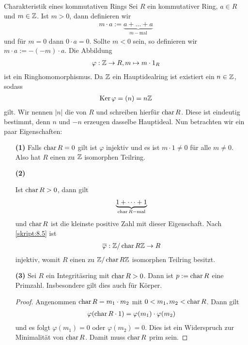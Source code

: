 \begin{genericdf}{Charakteristik eines kommutativen Rings}\label{skript:8.6}
	Sei $R$ ein kommutativer Ring, $a \in R$ und $m \in \mathbb{Z}$.
	Ist $m > 0 $, dann definieren wir 
	\begin{align*}
	m \cdot a := \underbrace{a + \dots + a}_{m-\text{mal}}
	\end{align*}
	und für $m=0$ dann $0 \cdot a = 0$.
	Sollte $m < 0 $ sein, so definieren wir $m \cdot a := -(-m) \cdot a$.
	Die Abbildung 
	\begin{align*}
	\varphi : \mathbb{Z} \to R, m \mapsto m \cdot 1_R
	\end{align*}
	ist ein Ringhomomorphismus.
	Da $\mathbb{Z}$ ein Hauptidealring ist existiert ein $n \in \mathbb{Z}$, sodass
	\begin{align*}
	\operatorname{Ker} \varphi = (n) = n \mathbb{Z}
	\end{align*}
	gilt.
	Wir nennen $|n|$ die  von $R$ und schreiben hierfür $\operatorname{char} R$.
	Diese ist eindeutig bestimmt, denn $n$ und $-n$ erzeugen dasselbe Hauptideal.
	Nun betrachten wir ein paar Eigenschaften:
	\begin{enumerate}
		\item[\textbf{(1)}]
		Falls $\operatorname{char} R = 0$ gilt ist $\varphi$ injektiv und es ist $m \cdot 1 \neq 0$ für alle $m \neq 0$.
		Also hat $R$ einen zu $\mathbb{Z}$ isomorphen Teilring.
		\item[\textbf{(2)}]
		
		Ist $\operatorname{char} R > 0$, dann gilt
		\begin{align*}
		\underbrace{1+ \dots + 1}_{\operatorname{char} R- \text{mal}}
		\end{align*}
		und $\operatorname{char} R$ ist die kleinste positive Zahl mit dieser Eigenschaft.
		Nach \ref{skript:8.5} ist 
		\begin{align*}
		\overline{\varphi} : \mathbb{Z} / \operatorname{char} R \mathbb{Z} \to R
		\end{align*}				
		injektiv, womit $R$ einen zu $\mathbb{Z} / \operatorname{char} R \mathbb{Z}$ isomorphen Teilring besitzt.
						
		\item[\textbf{(3)}]
		Sei $R$ ein Integritäsring mit $\operatorname{char} R > 0$.
		Dann ist $p := \operatorname{char} R $ eine Primzahl.
		Insbesondere gilt dies auch für Körper.
		\begin{proof}
			Angenommen $\operatorname{char} R = m_1 \cdot m_2$ mit $0 < m_1,m_2 < \operatorname{char} R$.
			Dann gilt
			\begin{align*}
			\varphi(\operatorname{char} R\cdot 1) 
			= \varphi(m_1) \cdot \varphi(m_2) 
			\end{align*}
			und es folgt $\varphi(m_1) = 0$ oder $\varphi(m_2) = 0$.
			Dies ist ein Widerspruch zur Minimalität von $\operatorname{char} R$.
			Damit muss $\operatorname{char} R$ prim sein.		
		\end{proof}
	\end{enumerate}
\end{genericdf}

